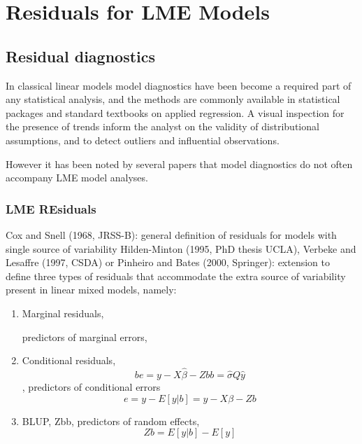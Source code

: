 \documentclass[Main.tex]{subfiles}
\begin{document}
\chapter{Residuals for LME Models}

\section{Residual diagnostics} %



In classical linear models model diagnostics have been become a required part of any statistical analysis, and the methods are commonly available in statistical packages and standard textbooks on applied regression. A visual inspection for the presence of trends inform the analyst on the validity of distributional assumptions, and to detect outliers and influential observations.

However it has been noted by several papers that model diagnostics do not often accompany LME model analyses.

\subsection{LME REsiduals}	
Cox and Snell (1968, JRSS-B): general definition of residuals for
models with single source of variability
Hilden-Minton (1995, PhD thesis UCLA), Verbeke and Lesaffre
(1997, CSDA) or Pinheiro and Bates (2000, Springer): extension to
define three types of residuals that accommodate the extra source of
variability present in linear mixed models, namely:

\begin{enumerate}
\item Marginal residuals, 

predictors of marginal errors, 


\item Conditional residuals, 
\[be = y − X\hat{\beta} − Zbb = \hat{\sigma}Q\hat{y}\] , predictors of
conditional errors 
\[e = y − E[y|b] = y − X\beta − Zb\]

\item BLUP, Zbb, predictors of random effects,
\[ Zb = E[y|b] − E[y]\]

\end{enumerate}
\end{document}
